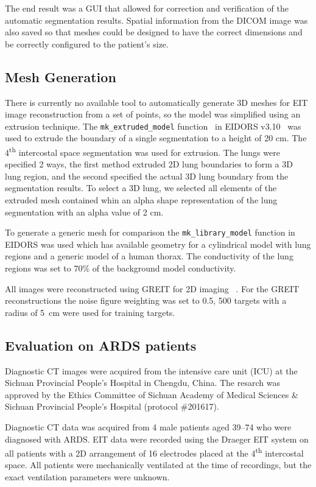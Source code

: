 The end result was a GUI that allowed for correction and verification of the automatic segmentation 
results. Spatial information from the DICOM image was also saved so that meshes could be
designed to have the correct dimensions and be correctly configured to the patient's size.

\subsection{Mesh Generation} \label{sec:mesh-gen}
There is currently no available tool to automatically generate 3D meshes for 
EIT image reconstruction from a set of points, so the model was simplified using an extrusion technique. 
The \verb!mk_extruded_model! 
function~\parencite{grychtol_fem_2013}
in EIDORS v3.10~\parencite{adler_eidors_2017} was used to extrude the boundary 
of a single segmentation to a height of 20 cm.
The 4\textsuperscript{th} intercostal space segmentation was used for extrusion.
The lungs were specified 2 ways, the first method extruded 2D lung boundaries to form a 3D 
lung region, 
and the second specified the actual 3D lung boundary from the segmentation results.  
To select a 3D lung, we selected all elements of the extruded mesh contained whin an 
alpha shape representation of the lung segmentation with an alpha value of 2 cm.

To generate a generic mesh for comparison the \verb!mk_library_model! function in 
EIDORS was used which has available geometry for a cylindrical model with lung regions
and a generic model of a human thorax. The conductivity of the lung regions was set to 
70\% of the background model conductivity.

All images were reconstructed using GREIT for 2D
imaging ~\parencite{adler_greit_2009}. For the GREIT 
reconstructions the noise figure weighting was set to 0.5, 
500 targets with a radius of 5 cm were used for training targets.

\subsection{Evaluation on ARDS patients} \label{sec:gi-scores}

Diagnostic CT images were acquired from the 
intensive care unit (ICU)
at the Sichuan Provincial People's Hospital
in Chengdu, China.
The resarch was approved
by the Ethics Committee of Sichuan Academy 
of Medical Sciences \& Sichuan Provincial People's Hospital
(protocol \#201617). 

Diagnostic CT data was acquired from 4 male 
patients aged 39--74 who were diagnosed with ARDS.
EIT data were recorded using the Draeger EIT system on all patients
with a 2D arrangement of 16 electrodes placed at the 
4\textsuperscript{th} intercostal space. 
All patients were mechanically ventilated
at the time of recordings, but the exact 
ventilation parameters were unknown.

